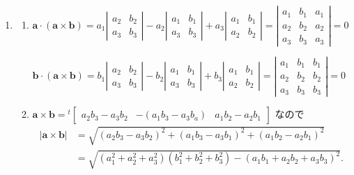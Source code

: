 \documentclass[11pt, uplatex, dvipdfmx]{jsarticle}
\begin{document}
\begin{enumerate}
\begin{enumerate}[(1)]
  \end{enumerate}

\item \label{crossproduct}
  \begin{enumerate}[(1)]
    \setlength{\itemsep}{1ex}
    
  \item $\bm{a} \cdot (\bm{a} \times \bm{b}) = a_1 \left|
      \begin{array}{rr}
        a_2 & b_2\\
        a_3 & b_3
      \end{array}
    \right| - a_2\left|
      \begin{array}{rr}
        a_1 & b_1\\
        a_3 & b_3
      \end{array}
    \right| + a_3\left|
      \begin{array}{rr}
        a_1 & b_1\\
        a_2 & b_2
      \end{array}
    \right| = \left|
      \begin{array}{rrr}
        a_1 & b_1 & a_1\\
        a_2 & b_2 & a_2\\
        a_3 & b_3 & a_3
      \end{array}
    \right| =0$

    $\bm{b} \cdot (\bm{a} \times \bm{b}) = b_1 \left|
      \begin{array}{rr}
        a_2 & b_2\\
        a_3 & b_3
      \end{array}
    \right| - b_2\left|
      \begin{array}{rr}
        a_1 & b_1\\
        a_3 & b_3
      \end{array}
    \right| + b_3\left|
      \begin{array}{rr}
        a_1 & b_1\\
        a_2 & b_2
      \end{array}
    \right| = \left|
      \begin{array}{rrr}
        a_1 & b_1 & b_1\\
        a_2 & b_2 & b_2\\
        a_3 & b_3 & b_3
      \end{array}
    \right| =0$

    
  \item  $\bm{a} \times \bm{b} = {}^{t} \left[
      \begin{array}{ccc}
        a_2 b_3 - a_3 b_2 & -(a_1b_3-a_3b_a) & a_1b_2-a_2b_1
      \end{array}
      \right]$ なので
    \[
      \begin{aligned}
        |\bm{a} \times \bm{b}| &= \sqrt{(a_2b_3-a_3b_2)^2 + (a_1b_3-a_3b_1)^2 + (a_1b_2-a_2b_1)^2}\\
        &= \sqrt{(a_1^2+a_2^2+a_3^2)(b_1^2+b_2^2+b_3^2) - (a_1b_1+a_2b_2+a_3b_3)^2}.
      \end{aligned}
    \]


\end{enumerate}
\end{enumerate}
\end{document}
